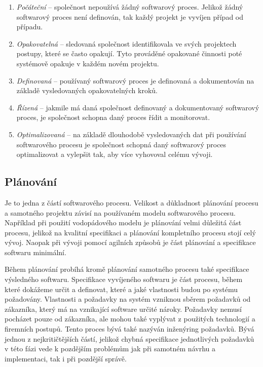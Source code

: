 \documentclass[czech,master,public,dept460,male,cpdeclaration,oneside]{diploma}
\begin{document}
\begin{enumerate}
\item \textit{Počáteční} -- společnost nepoužívá žádný softwarový proces. Jelikož žádný softwarový proces není definován, tak každý projekt je vyvíjen případ od případu.
\item \textit{Opakovatelná} -- sledovaná společnost identifikovala ve svých projektech postupy, které se často opakují. Tyto prováděné opakované činnosti poté systémově opakuje v každém novém projektu.
\item \textit{Definovaná} -- používaný softwarový proces je definovaná a dokumentován na základě vysledovaných opakovatelných kroků.
\item \textit{Řízená} -- jakmile má daná společnost definovaný a dokumentovaný softwarový proces, je společnost schopna daný proces řídit a monitorovat. 
\item \textit{Optimalizovaná} -- na základě dlouhodobě vysledovaných dat při používání softwarového procesu je společnost schopná daný softwarový proces optimalizovat a vylepšit tak, aby více vyhovoval celému vývoji.
\end{enumerate}


\subsection{Plánování}
Je to jedna z částí softwarového procesu. Velikost a důkladnost plánování procesu a samotného projektu závisí na používaném modelu softwarového procesu. Například při použití vodopádového modelu je plánování velmi důležitá část procesu, jelikož na kvalitní specifikaci a plánování kompletního procesu stojí celý vývoj. Naopak při vývoji pomocí agilních způsobů je část plánování a specifikace softwaru minimální. 

Během plánování probíhá kromě plánování samotného procesu také specifikace výsledného softwaru. Specifikace vyvíjeného softwaru je část procesu, během které dokážeme určit a definovat, které a jaké vlastnosti budou po systému požadovány. Vlastnosti a požadavky na systém vzniknou sběrem požadavků od zákazníka, který má na vznikající software určité nároky. Požadavky nemusí pocházet pouze od zákazníka, ale mohou také vyplývat z použitých technologií a firemních postupů. Tento proces bývá také nazýván inženýring požadavků. Bývá jednou z nejkritičtějších částí, jelikož chybná specifikace jednotlivých požadavků v této fázi vede k pozdějším problémům jak při samotném návrhu a implementaci, tak i při pozdější správě.
\end{document}
